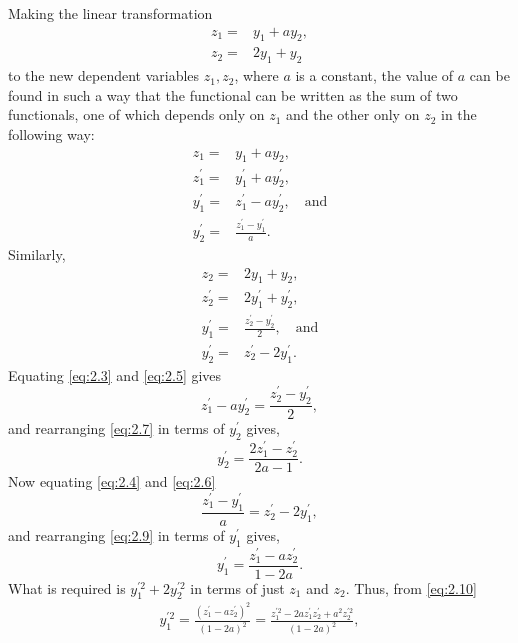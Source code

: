 Making the linear transformation
\begin{align*}
	z_1 =& y_1 + a y_2,\\
	z_2 = & 2y_1 + y_2
\end{align*}
to the new dependent variables $z_1, z_2$, where $a$ is a constant, the value of $a$ can be found in such a way that the functional can be written as the sum of two functionals, one of which depends only on $z_1$ and the other only on $z_2$ in the following way:
\begin{align}
	z_1 =& y_1 + a y_2,\nonumber\\
	z_1^\prime =& y_1^\prime + a y_2^\prime,\nonumber\\
	\label{eq:2.3}
	y_1^\prime =& z_1^\prime -ay_2^\prime,\quad \textrm{and} \\
	\label{eq:2.4}
	y_2^\prime =& \frac{z_1^\prime-y_1^\prime}{a}.
\end{align}
Similarly,
\begin{align}
	z_2 =& 2y_1 + y_2,\nonumber\\
	z_2^\prime =& 2y_1^\prime + y_2^\prime,\nonumber\\
	\label{eq:2.5}
	y_1^\prime =& \frac{z_2^\prime -y_2^\prime}{2},\quad \textrm{and} \\
	\label{eq:2.6}
	y_2^\prime =& z_2^\prime - 2y_1^\prime.
\end{align}
Equating \eqref{eq:2.3} and \eqref{eq:2.5} gives
\begin{equation}
	\label{eq:2.7}
	z_1^\prime - ay_2^\prime = \frac{z_2^\prime - y_2^\prime}{2},
\end{equation}
and rearranging \eqref{eq:2.7} in terms of $y_2^\prime$ gives,
\begin{equation}
	\label{eq:2.8}
	y_2^\prime = \frac{2z_1^\prime - z_2^\prime}{2a-1}.
\end{equation}
Now equating \eqref{eq:2.4} and \eqref{eq:2.6}
\begin{equation}
	\label{eq:2.9}
	\frac{z_1^\prime - y_1^\prime}{a} = z_2^\prime - 2y_1^\prime,
\end{equation}
and rearranging \eqref{eq:2.9} in terms of $y_1^\prime$ gives,
\begin{equation}
	\label{eq:2.10}
	y_1^\prime = \frac{z_1^\prime - az_2^\prime}{1-2a}.
\end{equation}
What is required is $y_1^{\prime2} + 2y_2^{\prime2}$ in terms of just  $z_1$ and  $z_2$. Thus, from \eqref{eq:2.10}
\begin{align*}
	y_1^{\prime2} = \frac{\left(z_1^\prime - az_2^\prime\right)^2}{\left(1-2a\right)^2} =
	\frac{z_1^{\prime2} - 2az_1^\prime z_2^\prime + a^2 z_2^{\prime2}}{\left(1-2a\right)^2},
\end{align*}

